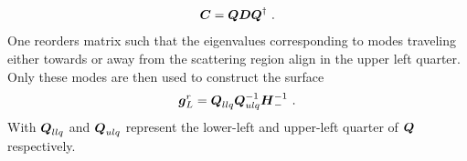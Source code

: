 \begin{align}
\boldsymbol{C} = \boldsymbol{Q}\boldsymbol{D}\boldsymbol{Q}^{\dagger}\ .
\label{eqn:schurdecomposition}
\end{align}
One reorders matrix  such that the eigenvalues corresponding to modes traveling either towards or away from the scattering region align in the upper left quarter. Only these modes are then used to construct the surface \gfnc{}
\begin{align}
\boldsymbol{g}^r_L = \boldsymbol{Q}_{llq}\boldsymbol{Q}_{ulq}^{-1}\boldsymbol{H}_{-}^{-1}\ .
\end{align}
With $\boldsymbol{Q}_{llq}$ and $\boldsymbol{Q}_{ulq}$ represent the lower-left and upper-left quarter of $\boldsymbol{Q}$ respectively. 
